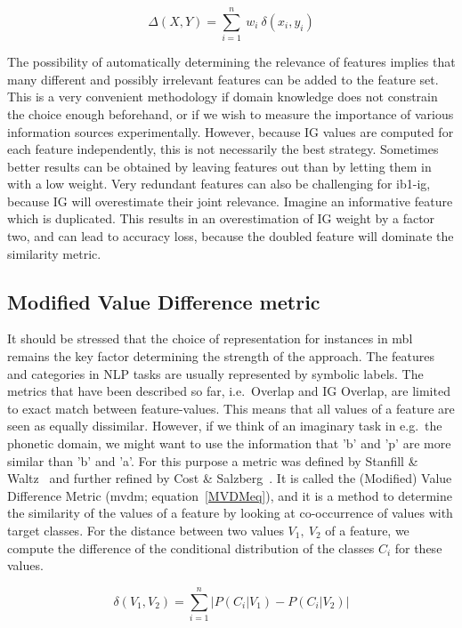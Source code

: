 \documentclass{report}
\begin{document}
\begin{equation}
\Delta(X,Y) = \sum_{i=1}^{n}\ w_{i} \ \delta(x_{i},y_{i})
\label{distancew}
\end{equation} 

The possibility of automatically determining the relevance of features
implies that many different and possibly irrelevant features can be
added to the feature set. This is a very convenient methodology if
domain knowledge does not constrain the choice enough beforehand, or
if we wish to measure the importance of various information sources
experimentally. However, because IG values are computed for each
feature independently, this is not necessarily the best
strategy. Sometimes better results can be obtained by leaving features
out than by letting them in with a low weight. Very redundant features
can also be challenging for {\sc ib1-ig}, because IG will overestimate
their joint relevance. Imagine an informative feature which is
duplicated. This results in an overestimation of IG weight by a factor
two, and can lead to accuracy loss, because the doubled feature will
dominate the similarity metric.

\subsection{Modified Value Difference metric}
\label{mvdm}

It should be stressed that the choice of representation for instances
in {\sc mbl} remains the key factor determining the strength of the
approach. The features and categories in NLP tasks are usually
represented by symbolic labels. The metrics that have been described
so far, i.e.~Overlap and IG Overlap, are limited to exact match
between feature-values. This means that all values of a feature are
seen as equally dissimilar. However, if we think of an imaginary task
in e.g.~the phonetic domain, we might want to use the information that
'b' and 'p' are more similar than 'b' and 'a'. For this purpose a
metric was defined by Stanfill \& Waltz~\cite{Stanfill+86} and further
refined by Cost \& Salzberg~\cite{Cost+93}. It is called the
(Modified) Value Difference Metric ({\sc mvdm}; equation~\ref{MVDMeq}), and
it is a method to determine the similarity of the values of a feature
by looking at co-occurrence of values with target classes. For the
distance between two values $V_{1},\ V_{2}$ of a feature, we compute
the difference of the conditional distribution of the classes $C_{i}$
for these values.

\begin{equation}
\delta(V_{1}, V_{2}) = \sum_{i=1}^{n} \left| P(C_{i}|V_{1}) - P(C_{i}|V_{2})
\right|
\label{MVDMeq}
\end{equation}
\end{document}
